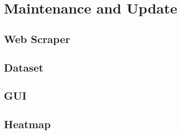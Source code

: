 \documentclass[main]{subfiles}
\begin{document}
\section{Maintenance and Update}
\subsection{Web Scraper}
    


\subsection{Dataset}

\subsection{GUI}

\subsection{Heatmap}
\end{document}
